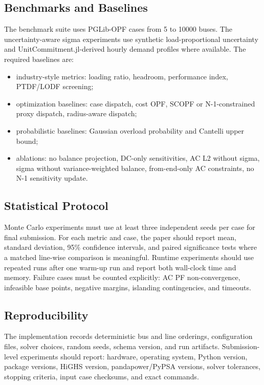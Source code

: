\documentclass[11pt]{article}
\begin{document}
\subsection{Benchmarks and Baselines}

The benchmark suite uses PGLib-OPF cases from 5 to 10000 buses. The uncertainty-aware sigma experiments use synthetic load-proportional uncertainty and UnitCommitment.jl-derived hourly demand profiles where available. The required baselines are:
\begin{itemize}[leftmargin=*]
  \item industry-style metrics: loading ratio, headroom, performance index, PTDF/LODF screening;
  \item optimization baselines: case dispatch, cost OPF, SCOPF or N-1-constrained proxy dispatch, radius-aware dispatch;
  \item probabilistic baselines: Gaussian overload probability and Cantelli upper bound;
  \item ablations: no balance projection, DC-only sensitivities, AC L2 without sigma, sigma without variance-weighted balance, from-end-only AC constraints, no N-1 sensitivity update.
\end{itemize}

\subsection{Statistical Protocol}

Monte Carlo experiments must use at least three independent seeds per case for final submission. For each metric and case, the paper should report mean, standard deviation, 95\% confidence intervals, and paired significance tests where a matched line-wise comparison is meaningful. Runtime experiments should use repeated runs after one warm-up run and report both wall-clock time and memory. Failure cases must be counted explicitly: AC PF non-convergence, infeasible base points, negative margins, islanding contingencies, and timeouts.

\subsection{Reproducibility}

The implementation records deterministic bus and line orderings, configuration files, solver choices, random seeds, schema version, and run artifacts. Submission-level experiments should report: hardware, operating system, Python version, package versions, HiGHS version, pandapower/PyPSA versions, solver tolerances, stopping criteria, input case checksums, and exact commands.
\end{document}
